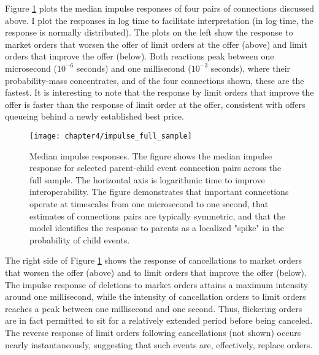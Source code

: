 		Figure \ref{fig:impulse_full_sample} plots the median impulse responses of four pairs of connections discussed above. I plot the responses in log time to facilitate interpretation (in log time, the response is normally distributed). The plots on the left show the response to market orders that worsen the offer of limit orders at the offer (above) and limit orders that improve the offer (below). Both reactions peak between one microsecond ($10^{-6}$ seconds) and one millisecond ($10^{-3}$ seconds), where their probability-mass concentrates, and of the four connections shown, these are the fastest. It is interesting to note that the response by limit orders that improve the offer is faster than the response of limit order at the offer, consistent with offers queueing behind a newly established best price.

		\begin{figure}[p]
			\small
			\linespread{1}
			\centering
			\texttt{[image: chapter4/impulse\_full\_sample]}
			\captionsetup{skip=-20pt, position=below, font=footnotesize, justification=justified, width=\linewidth}
			\caption[Median impulse responses]{Median impulse responses. The figure shows the median impulse response for selected parent-child event connection pairs across the full sample. The horizontal axis is logarithmic time to improve interoperability. The figure demonstrates that important connections operate at timescales from one microsecond to one second, that estimates of connections pairs are typically symmetric, and that the model identifies the response to parents as a localized "spike" in the probability of child events.}
			\label{fig:impulse_full_sample}
		\end{figure}

		The right side of Figure \ref{fig:impulse_full_sample} shows the response of cancellations to market orders that worsen the offer (above) and to limit orders that improve the offer (below). The impulse response of deletions to market orders attains a maximum intensity around one millisecond, while the intensity of cancellation orders to limit orders reaches a peak between one millisecond and one second. Thus, flickering orders are in fact permitted to sit for a relatively extended period before being canceled. The reverse response of limit orders following cancellations (not shown) occurs nearly instantaneously, suggesting that such events are, effectively, replace orders.

